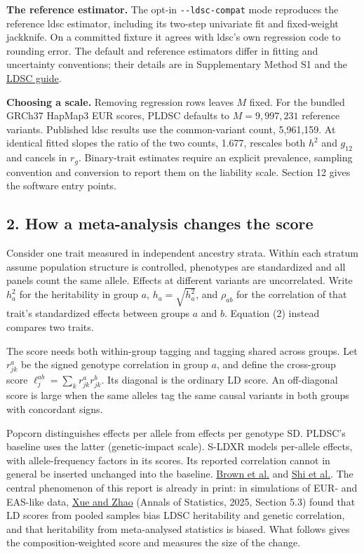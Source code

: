 \documentclass[11pt,a4paper]{article}
\let\reportsection\subsection
\newif\ifinsupplement
\renewcommand{\subsection}[1]{\clearpage
  \ifstrequal{#1}{Supplementary Methods}{\insupplementtrue
    \fancyhead[R]{\small\sffamily Supplementary methods}}{}
  \reportsection{#1}}
\begin{document}
\textbf{The reference estimator.} The opt-in \texttt{-\/-ldsc-compat} mode reproduces the reference ldsc estimator, including its two-step univariate fit and fixed-weight jackknife. On a committed fixture it agrees with ldsc's own regression code to rounding error. The default and reference estimators differ in fitting and uncertainty conventions; their details are in Supplementary Method S1 and the \href{../docs/LDSC.md\#ldsc-equivalence}{LDSC guide}.

\textbf{Choosing a scale.} Removing regression rows leaves \(M\) fixed. For the bundled GRCh37 HapMap3 EUR scores, PLDSC defaults to \(M=9{,}997{,}231\) reference variants. Published ldsc results use the common-variant count, 5,961,159. At identical fitted slopes the ratio of the two counts, 1.677, rescales both \(h^2\) and \(g_{12}\) and cancels in \(r_g\). Binary-trait estimates require an explicit prevalence, sampling convention and conversion to report them on the liability scale. Section 12 gives the software entry points.

\subsection{2. How a meta-analysis changes the score}\label{2-how-a-meta-analysis-changes-the-score}

Consider one trait measured in independent ancestry strata. Within each stratum assume population structure is controlled, phenotypes are standardized and all panels count the same allele. Effects at different variants are uncorrelated. Write \(h_a^2\) for the heritability in group \(a\), \(h_a=\sqrt{h_a^2}\), and \(\rho_{ab}\) for the correlation of that trait's standardized effects between groups \(a\) and \(b\). Equation (2) instead compares two traits.

The score needs both within-group tagging and tagging shared across groups. Let \(r^a_{jk}\) be the signed genotype correlation in group \(a\), and define the cross-group score \(\ell_j^{ab}=\sum_k r^a_{jk}r^b_{jk}\). Its diagonal is the ordinary LD score. An off-diagonal score is large when the same alleles tag the same causal variants in both groups with concordant signs.

Popcorn distinguishes effects per allele from effects per genotype SD. PLDSC's baseline uses the latter (genetic-impact scale). S-LDXR models per-allele effects, with allele-frequency factors in its scores. Its reported correlation cannot in general be inserted unchanged into the baseline. \href{https://doi.org/10.1016/j.ajhg.2016.05.001}{Brown et al.} and \href{https://pmc.ncbi.nlm.nih.gov/articles/PMC7889654/}{Shi et al.}. The central phenomenon of this report is already in print: in simulations of EUR- and EAS-like data, \href{https://doi.org/10.1214/25-AOS2523}{Xue and Zhao} (Annals of Statistics, 2025, Section 5.3) found that LD scores from pooled samples bias LDSC heritability and genetic correlation, and that heritability from meta-analysed statistics is biased. What follows gives the composition-weighted score and measures the size of the change.
\end{document}

